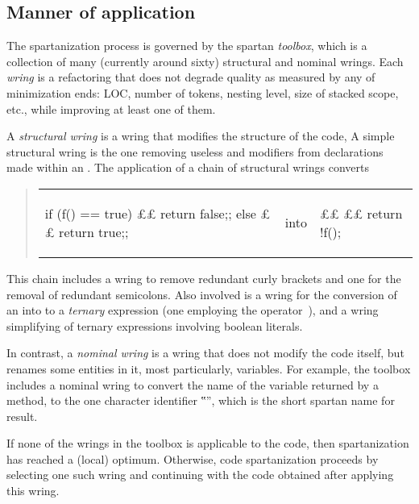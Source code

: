 \subsection{Manner of application}
\label{section:manner}
The spartanization process is governed by the spartan
\emph{toolbox}, which is a collection of many (currently around sixty)
structural and nominal wrings. Each \emph{wring} is a refactoring that does
not degrade quality as measured by any of minimization ends: LOC, number of
tokens, nesting level, size of stacked scope, etc., while improving at least
one of them.

A \emph{structural wring} is a wring that modifies the structure of the code, A
simple structural wring is the one removing useless  and
 modifiers from declarations made within an .
The application of a chain of structural wrings converts
\vspace{-2ex}

\begin{quote}
\begin{tabular}{m{15ex}m{4ex}m{10ex}}
\begin{java}
if (f() == true) {££
  return false;;
} else {££
  return true;;
}
\end{java}
& into &
\begin{java}
££
££
  return !f();
\end{java}
\end{tabular}
\end{quote}
\vspace{-4ex}

This chain includes a wring to remove redundant curly brackets and
one for the removal of redundant semicolons. Also involved is a wring for the
conversion of an  into to a \emph{ternary} expression (one employing the
operator~), and a wring simplifying of ternary expressions
involving boolean literals.

In contrast, a \emph{nominal wring} is a wring that does not modify the
code itself, but renames some entities in it, most particularly, variables.
For example, the toolbox includes a nominal wring to convert the name of the
variable returned by a method, to the one character identifier ‟\cc{\$}”,
which is the short spartan name for result.

If none of the wrings in the toolbox is applicable to the code, then
spartanization has reached a (local) optimum. Otherwise, code spartanization
proceeds by selecting one such wring and continuing with the code obtained
after applying this wring.

